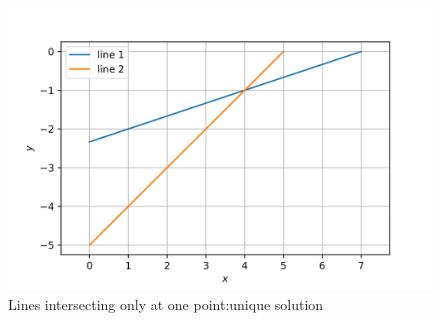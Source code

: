 \documentclass[journal,12pt,twocolumn]{IEEEtran}
\begin{document}
\begin{enumerate}
\begin{figure}[H]
    \includegraphics[width= \columnwidth]{assignment2d-1.png}
    \caption{Lines intersecting only at one point:unique solution}
    \label{fig:2}
\end{figure}
\end{enumerate}
\end{document}
